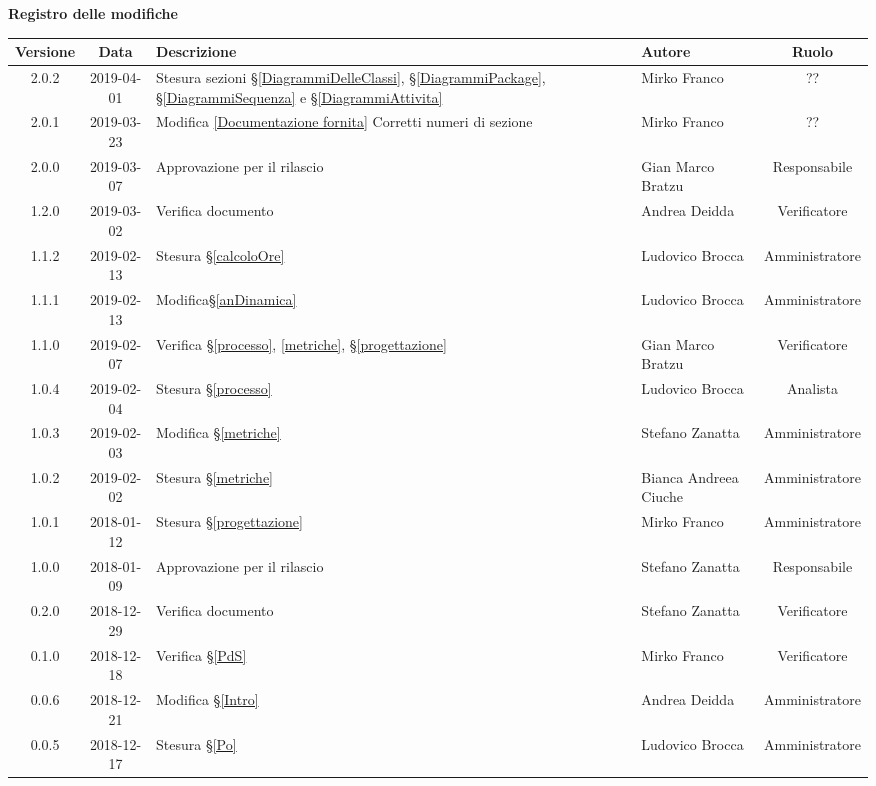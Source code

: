 \begin{center}
	\textbf{Registro delle modifiche}
	\end{center}
	\begin{center}
		\begin{tabularx}{\textwidth}{|c|c|X|X|c|}
			\hline
			\textbf{Versione} & \textbf{Data} & \textbf{Descrizione} & \textbf{Autore} & \textbf{Ruolo} \\ 
			\hline
			2.0.2 & 2019-04-01 & Stesura sezioni \S\ref{DiagrammiDelleClassi}, \S\ref{DiagrammiPackage}, \S\ref{DiagrammiSequenza} e \S\ref{DiagrammiAttivita}  & Mirko Franco & ?? \\
			\hline
			2.0.1 & 2019-03-23 & Modifica \ref{Documentazione fornita} Corretti numeri di sezione & Mirko Franco & ?? \\
			\hline
			2.0.0 &2019-03-07 & Approvazione per il rilascio & Gian Marco Bratzu& Responsabile\\
			\hline
			1.2.0 &2019-03-02 & Verifica documento &Andrea Deidda& Verificatore\\
			\hline
			1.1.2 &2019-02-13 &Stesura \S\ref{calcoloOre} &Ludovico Brocca& Amministratore\\
			\hline
			1.1.1 &2019-02-13 &Modifica\S \ref{anDinamica} &Ludovico Brocca& Amministratore\\
			\hline
			1.1.0 &2019-02-07 &Verifica \S\ref{processo}, \ref{metriche}, \S\ref{progettazione} &Gian Marco Bratzu& Verificatore\\
			\hline
			1.0.4 &2019-02-04&Stesura \S\ref{processo}&Ludovico Brocca& Analista\\
			\hline
			1.0.3 & 2019-02-03 & Modifica \S\ref{metriche} & Stefano Zanatta & Amministratore\\
			\hline
			1.0.2 & 2019-02-02 & Stesura \S\ref{metriche} & Bianca Andreea Ciuche & Amministratore\\
			\hline
			1.0.1 & 2018-01-12 & Stesura \S\ref{progettazione} & Mirko Franco & Amministratore \\
			\hline
			1.0.0 & 2018-01-09 & Approvazione per il rilascio & Stefano Zanatta & Responsabile\\
			\hline
			0.2.0 & 2018-12-29 & Verifica documento & Stefano Zanatta & Verificatore\\
			\hline
			0.1.0 & 2018-12-18 & Verifica \S\ref{PdS} & Mirko Franco & Verificatore\\
			\hline
			0.0.6 & 2018-12-21 & Modifica \S\ref{Intro} & Andrea Deidda & Amministratore\\
			\hline
			0.0.5 & 2018-12-17 & Stesura \S\ref{Po} & Ludovico Brocca & Amministratore\\

\end{tabularx}
\end{center}
